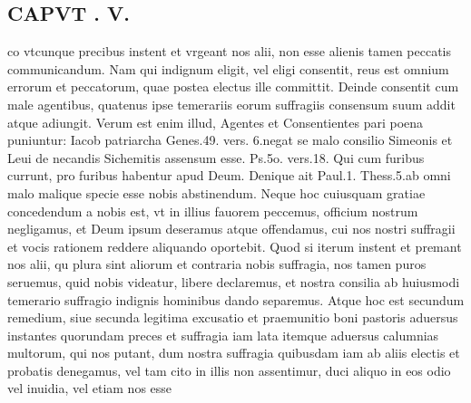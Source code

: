 \documentclass{article}
\begin{document}
\begin{pages}
\section*{CAPVT . V. }
\marginpar{[ p.339 ]}\pstart co vtcunque precibus instent et vrgeant nos alii, non esse alienis tamen peccatis communicandum. Nam qui indignum eligit, vel eligi consentit, reus est omnium errorum et peccatorum, quae postea electus ille committit. Deinde consentit cum male agentibus, quatenus ipse temerariis eorum suffragiis consensum suum addit atque adiungit. Verum est enim illud, Agentes et Consentientes pari poena puniuntur: Iacob patriarcha Genes.49. vers. 6.negat se malo consilio Simeonis et Leui de necandis Sichemitis assensum esse. Ps.5o. vers.18. Qui cum furibus currunt, pro furibus habentur apud Deum. Denique ait Paul.1. Thess.5.ab omni malo malique specie esse nobis abstinendum. Neque hoc cuiusquam gratiae concedendum a nobis est, vt in illius fauorem peccemus, officium nostrum negligamus, et Deum ipsum deseramus atque offendamus, cui nos nostri suffragii et vocis rationem reddere aliquando oportebit.  \pend\pstart Quod si iterum instent et premant nos alii, qu plura sint aliorum et contraria nobis suffragia, nos tamen puros seruemus, quid nobis videatur, libere declaremus, et nostra consilia ab huiusmodi temerario suffragio indignis hominibus dando separemus. Atque hoc est secundum remedium, siue secunda legitima excusatio et praemunitio boni pastoris aduersus instantes quorundam preces et suffragia iam lata itemque aduersus calumnias multorum, qui nos putant, dum nostra suffragia quibusdam iam ab aliis electis et probatis denegamus, vel tam cito in illis non assentimur, duci aliquo in eos odio vel inuidia, vel etiam nos esse  \pend

\end{pages}
\end{document}

